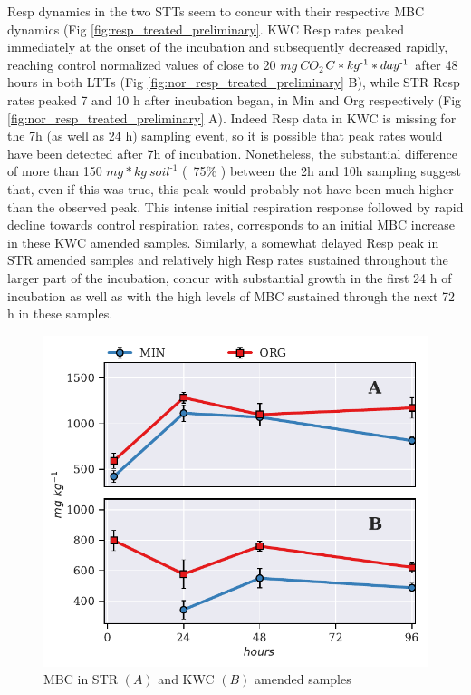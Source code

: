 \documentclass[12pt]{report}
\newlength{\SpaceAfterUnit}
\newcommand{\respunit}{$ mg\ CO_2$\text{-}$C * kg^{\text{-}1} * day^{\text{\text{-}}1}$ \hspace*{\SpaceAfterUnit}}
\newcommand{\genericunit}{$ mg * kg\ soil^{\text{-}1}$ \hspace*{\SpaceAfterUnit}}
\begin{document}
        Resp dynamics in the two STTs seem to concur with their respective MBC dynamics (Fig \ref{fig:resp_treated_preliminary}. KWC Resp rates peaked immediately at the onset of the incubation and subsequently decreased rapidly, reaching control normalized values of close to 20 \respunit after 48 hours in both LTTs (Fig \ref{fig:nor_resp_treated_preliminary} B), while STR Resp rates peaked 7 and 10 h after incubation began, in Min and Org respectively (Fig \ref{fig:nor_resp_treated_preliminary} A). Indeed Resp data in KWC is missing for the 7h (as well as 24 h) sampling event, so it is possible that peak rates would have been detected after 7h of incubation. Nonetheless, the substantial difference of more than 150 \genericunit (~75$\%$ ) between the 2h and 10h sampling suggest that, even if this was true, this peak would probably not have been much higher than the observed peak. This intense initial respiration response followed by rapid decline towards control respiration rates, corresponds  to an initial MBC increase in these KWC amended samples. Similarly, a somewhat delayed Resp peak in STR amended samples and relatively high Resp rates sustained throughout the larger part of the incubation, concur with substantial growth in the first 24 h of incubation as well as with the high levels of MBC sustained through the next 72 h in these samples.      
		
		
		\begin{figure}[H]
			\centering
			\includegraphics[scale=1]{thesis_figures/preliminary/treated/MBC.pdf}
			\caption{MBC in STR $\left(A\right)$ and KWC $\left(B\right)$ amended   samples}
			\label{fig:mbc_treated_preliminary}
		\end{figure}
	
\end{document}
